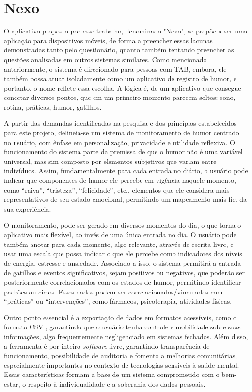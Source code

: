 \chapter{Nexo}

O aplicativo proposto por esse trabalho, denominado "Nexo", se propõe a ser uma
aplicação para dispositivos móveis, de forma a preencher essas lacunas
demonstradas tanto pelo questionário, quanto também tentando preencher as
questões analisadas em outros sistemas similares. Como mencionado
anteriormente, o sistema é direcionado para pessoas com TAB, embora, ele também
possa atuar isoladamente como um aplicativo de registro de humor, e portanto, o
nome reflete essa escolha. A lógica é, de um aplicativo que consegue conectar
diversos pontos, que em um primeiro momento parecem soltos: sono, rotina,
práticas, humor, gatilhos.

A partir das demandas identificadas na pesquisa e dos princípios estabelecidos
para este projeto, delineia-se um sistema de monitoramento de humor centrado no
usuário, com ênfase em personalização, privacidade e utilidade reflexiva. O
funcionamento do sistema parte da premissa de que o humor não é uma variável
universal, mas sim composto por elementos subjetivos que variam entre
indivíduos. Assim, fundamentalmente para cada entrada no diário, o usuário pode
indicar que componentes de humor ele percebe em vigência naquele momento, como
``raiva'', ``tristeza'', ``felicidade'', etc., elementos que ele considera mais
representativos de seu estado emocional, permitindo um mapeamento mais fiel da
sua experiência.

O monitoramento, pode ser gerado em diversos momentos do dia, o que torna o
aplicativo mais flexível, ao invés de uma única entrada no dia. O usuário pode
também anotar para cada momento, algo relevante, através de escrita livre, e
usar uma escala que possa indicar o que ele percebe como indicadores dos níveis
de energia, estresse e ansiedade. Associado a isso, o sistema permitirá a
entrada de gatilhos e eventos significativos, sejam positivos ou negativos, que
poderão ser posteriormente correlacionados com os estados de humor, permitindo
identificar padrões ou ciclos. Esses dados podem ser correlacionados/vinculados
com ``práticas'' ou ``intervenções'', como fármacos, psicoterapia, atividades
físicas.

Outro ponto essencial é a exportação de dados em formatos acessíveis, como o
formato CSV \cite{Shafranovich_2005}, garantindo que o usuário tenha controle e
mobilidade sobre suas informações, algo frequentemente negligenciado em
sistemas fechados. Além disso, a ferramenta é por inteiro \textit{software}
livre, garantindo transparência de funcionamento, possibilidade de auditoria e
fomento a melhorias comunitárias, especialmente importantes no contexto de
tecnologias sensíveis à saúde mental. Essas características formam a base de um
sistema comprometido com o bem-estar, o respeito à individualidade e a
soberania dos dados pessoais.

